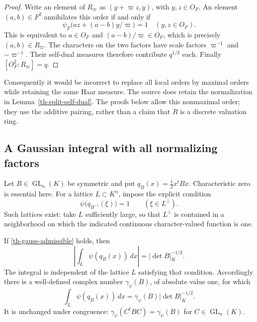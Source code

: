 \begin{proof}
Write an element of $R_\varpi$ as $(y+\varpi z,y)$, with $y,z\in O_F$.
An element $(a,b)\in F^2$ annihilates this order if and only if
\[
 \psi_F\bigl(az+(a-b)y/\varpi\bigr)=1
 \quad(y,z\in O_F).
\]
This is equivalent to $a\in O_F$ and $(a-b)/\varpi\in O_F$, which
is precisely $(a,b)\in R_\varpi$.  The characters on the two factors
have scale factors $\varpi^{-1}$ and $-\varpi^{-1}$.  Their self-dual
measures therefore contribute $q^{1/2}$ each.  Finally
$[O_F^2:R_\varpi]=q$.
\end{proof}

Consequently it would be incorrect to replace all local orders by maximal
orders while retaining the same Haar measure.  The source does retain the
normalization in Lemma~\ref{th-split-self-dual}.  The proofs below allow
this nonmaximal order; they use the additive pairing, rather than a claim
that $R$ is a discrete valuation ring.

\subsection{A Gaussian integral with all normalizing factors}

Let $B\in\operatorname{GL}_n(K)$ be symmetric and put
$q_B(x)=\tfrac12x^tBx$.  Characteristic zero is essential here.
For a lattice $L\subset K^n$, impose the explicit condition
\begin{equation}\label{th-gauss-admissible}
 \psi\bigl(q_{B^{-1}}(\xi)\bigr)=1\qquad(\xi\in L^\perp).
\end{equation}
Such lattices exist: take $L$ sufficiently large, so that $L^\perp$
is contained in a neighborhood on which the indicated continuous
character-valued function is one.

\begin{lemma}\label{th-gaussian}
If \eqref{th-gauss-admissible} holds, then
\[
 \left|\int_L\psi(q_B(x))\,dx\right|=|\det B|_K^{-1/2}.
\]
The integral is independent of the lattice $L$ satisfying that condition.
Accordingly there is a well-defined complex number $\gamma_\psi(B)$,
of absolute value one, for which
\begin{equation}\label{th-gaussian-value}
 \int_L\psi(q_B(x))\,dx
   =\gamma_\psi(B)|\det B|_K^{-1/2}.
\end{equation}
It is unchanged under congruence:
$\gamma_\psi(C^tBC)=\gamma_\psi(B)$ for $C\in\operatorname{GL}_n(K)$.
\end{lemma}

